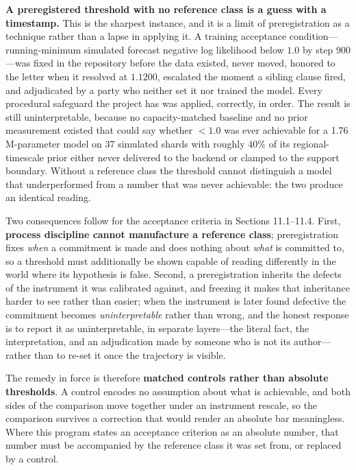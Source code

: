 \textbf{A preregistered threshold with no reference class is a guess with a
timestamp.} This is the sharpest instance, and it is a limit of preregistration
as a technique rather than a lapse in applying it. A training acceptance
condition---running-minimum simulated forecast negative log likelihood below
\(1.0\) by step 900---was fixed in the repository before the data existed, never
moved, honored to the letter when it resolved at \(1.1200\), escalated the
moment a sibling clause fired, and adjudicated by a party who neither set it nor
trained the model. Every procedural safeguard the project has was applied,
correctly, in order. The result is still uninterpretable, because no
capacity-matched baseline and no prior measurement existed that could say
whether \(<1.0\) was ever achievable for a 1.76\,M-parameter model on 37
simulated shards with roughly \(40\%\) of its regional-timescale prior either
never delivered to the backend or clamped to the support boundary. Without a
reference class the threshold cannot distinguish a model that underperformed
from a number that was never achievable: the two produce an identical reading.

Two consequences follow for the acceptance criteria in Sections 11.1--11.4.
First, \textbf{process discipline cannot manufacture a reference class};
preregistration fixes \emph{when} a commitment is made and does nothing about
\emph{what} is committed to, so a threshold must additionally be shown capable
of reading differently in the world where its hypothesis is false. Second, a
preregistration inherits the defects of the instrument it was calibrated
against, and freezing it makes that inheritance harder to see rather than
easier; when the instrument is later found defective the commitment becomes
\emph{uninterpretable} rather than wrong, and the honest response is to report
it as uninterpretable, in separate layers---the literal fact, the interpretation,
and an adjudication made by someone who is not its author---rather than to
re-set it once the trajectory is visible.

The remedy in force is therefore \textbf{matched controls rather than absolute
thresholds}. A control encodes no assumption about what is achievable, and both
sides of the comparison move together under an instrument rescale, so the
comparison survives a correction that would render an absolute bar meaningless.
Where this program states an acceptance criterion as an absolute number, that
number must be accompanied by the reference class it was set from, or replaced
by a control.

